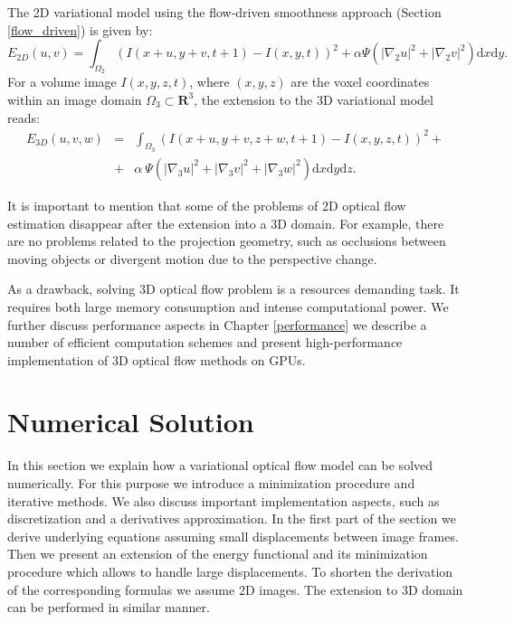The 2D variational \opticalflow model using the flow-driven smoothness approach (Section \ref{flow_driven}) is given by:
$$ E_{2D}(u,v) = \int_{\Omega_{2}}{(I(x+u,y+v,t+1) - I(x,y,t))^2 + \alpha \Psi(|\nabla_{2}u|^2 + |\nabla_{2}v|^2) \text{d}x \text{d}y}. $$
For a volume image $I(x,y,z,t)$, where $(x,y,z)$ are the voxel coordinates within an image domain $ \Omega_{3} \subset \mathbf{R}^3$, the extension to the 3D variational model reads:
\begin{eqnarray}
E_{3D}(u,v,w) &=& \int_{\Omega_{3}}{}(I(x+u,y+v, z+w, t+1) - I(x,y,z,t))^2 + \nonumber \\  
 &+& \alpha \: \Psi(|\nabla_{3}u|^2 + |\nabla_{3}v|^2 + |\nabla_{3}w|^2) \text{d}x \text{d}y \text{d}z. \nonumber
\end{eqnarray}

It is important to mention that some of the problems of 2D optical flow estimation disappear after the extension into a 3D domain. For example, there are no problems related to the projection geometry, such as occlusions between moving objects or divergent motion due to the perspective change.

As a drawback, solving 3D optical flow problem is a resources demanding task. It requires both large memory consumption and intense computational power. We further discuss performance aspects in Chapter \ref{performance} we describe a number of efficient computation schemes and present high-performance implementation of 3D optical flow methods on GPUs. 



\section{Numerical Solution}

In this section we explain how a variational optical flow model can be solved numerically. For this purpose we introduce a minimization procedure and iterative methods. We also discuss important implementation aspects, such as discretization and a derivatives approximation. In the first part of the section we derive underlying equations assuming small displacements between image frames.  Then we present an extension of the energy functional and its minimization procedure which allows to handle large displacements. To shorten the derivation of the corresponding formulas we assume 2D images. The extension to 3D domain can be performed in similar manner.   


